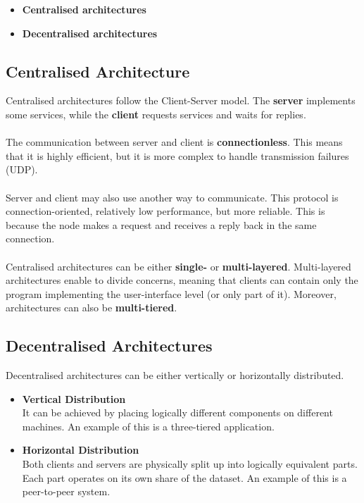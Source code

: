 \documentclass{article}
\begin{document}
\begin{itemize}
	\item \textbf{Centralised architectures}
	\item \textbf{Decentralised architectures}
\end{itemize}

\subsection{Centralised Architecture}
Centralised architectures follow the Client-Server model. The \textbf{server} implements some services, while the \textbf{client} requests services and waits for replies. \\ \\
The communication between server and client is \textbf{connectionless}. This means that it is highly efficient, but it is more complex to handle transmission failures (UDP). \\ \\
Server and client may also use another way to communicate. This protocol is connection-oriented, relatively low performance, but more reliable. This is because the node makes a request and receives a reply back in the same connection. \\ \\
Centralised architectures can be either \textbf{single-} or \textbf{multi-layered}. Multi-layered architectures enable to divide concerns, meaning that clients can contain only the program implementing the user-interface level (or only part of it). Moreover, architectures can also be \textbf{multi-tiered}.

\subsection{Decentralised Architectures}
Decentralised architectures can be either vertically or horizontally distributed.

\begin{itemize}
	\item \textbf{Vertical Distribution} \\
	It can be achieved by placing logically different components on different machines. An example of this is a three-tiered application.
	
	\item \textbf{Horizontal Distribution} \\
	Both clients and servers are physically split up into logically equivalent parts. Each part operates on its own share of the dataset. An example of this is a peer-to-peer system.
\end{itemize}
\end{document}
